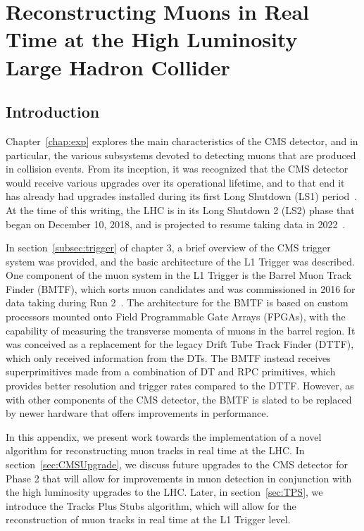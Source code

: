 
\chapter{Reconstructing Muons in Real Time at the High Luminosity Large Hadron Collider}
\label{chap:TPSappendix}

\section{Introduction}

Chapter~\ref{chap:exp} explores the main characteristics of the CMS detector, and in particular, the various subsystems devoted to detecting muons that are produced in collision events.
From its inception, it was recognized that the CMS detector would receive various upgrades over its operational lifetime, and to that end it has already had upgrades installed during its first Long Shutdown (LS1) period~\cite{Battilana:2017mrm,Kreis:2103853}.
At the time of this writing, the LHC is in its Long Shutdown 2 (LS2) phase that began on December 10, 2018, and is projected to resume taking data in 2022~\cite{LHCsched}.

In section~\ref{subsec:trigger} of chapter 3, a brief overview of the CMS trigger system was provided, and the basic architecture of the L1 Trigger was described.
One component of the muon system in the L1 Trigger is the Barrel Muon Track Finder (BMTF), which sorts muon candidates and was commissioned in 2016 for data taking during Run 2~\cite{Ero:2102885}.
The architecture for the BMTF is based on custom processors mounted onto Field Programmable Gate Arrays (FPGAs), with the capability of measuring the transverse momenta of muons in the barrel region.
It was conceived as a replacement for the legacy Drift Tube Track Finder (DTTF), which only received information from the DTs.
The BMTF instead receives superprimitives made from a combination of DT and RPC primitives, which provides better resolution and trigger rates compared to the DTTF.
However, as with other components of the CMS detector, the BMTF is slated to be replaced by newer hardware that offers improvements in performance.

In this appendix, we present work towards the implementation of a novel algorithm for reconstructing muon tracks in real time at the LHC.
In section~\ref{sec:CMSUpgrade}, we discuss future upgrades to the CMS detector for Phase 2 that will allow for improvements in muon detection in conjunction with the high luminosity upgrades to the LHC.
Later, in section~\ref{sec:TPS}, we introduce the Tracks Plus Stubs algorithm, which will allow for the reconstruction of muon tracks in real time at the L1 Trigger level.


